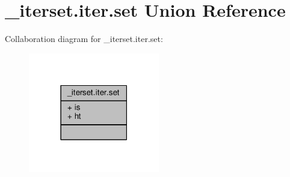 \hypertarget{unionzsetopsrc_1_1__iterset_8iter_8set}{}\section{\+\_\+iterset.\+iter.\+set Union Reference}
\label{unionzsetopsrc_1_1__iterset_8iter_8set}


Collaboration diagram for \+\_\+iterset.\+iter.\+set\+:\nopagebreak
\begin{figure}[H]
\begin{center}
\leavevmode
\includegraphics[width=162pt]{unionzsetopsrc_1_1__iterset_8iter_8set__coll__graph}
\end{center}
\end{figure}
